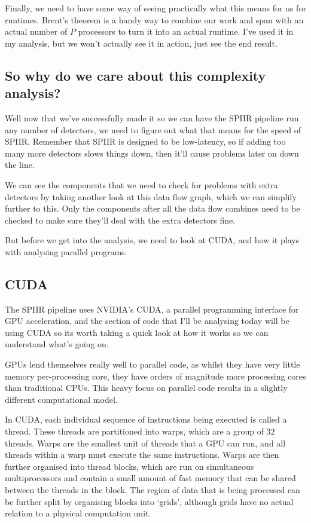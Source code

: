 \documentclass{article}
\begin{document}
Finally, we need to have some way of seeing practically what this means for us for runtimes.
Brent's theorem is a handy way to combine our work and span with an actual number of $P$ processors to turn it into an actual runtime.
I've used it in my analysis, but we won't actually see it in action, just see the end result.

\subsection{So why do we care about this complexity analysis?}

Well now that we've successfully made it so we can have the SPIIR pipeline run any number of detectors, we need to figure out what that means for the speed of SPIIR.
Remember that SPIIR is designed to be low-latency, so if adding too many more detectors slows things down, then it'll cause problems later on down the line.

We can see the components that we need to check for problems with extra detectors by taking another look at this data flow graph, which we can simplify further to this.
Only the components after all the data flow combines need to be checked to make sure they'll deal with the extra detectors fine.

But before we get into the analysis, we need to look at CUDA, and how it plays with analysing parallel programs.

\subsection{CUDA}

The SPIIR pipeline uses NVIDIA's CUDA, a parallel programming interface for GPU acceleration, and the section of code that I'll be analysing today will be using CUDA so its worth taking a quick look at how it works so we can understand what's going on.

GPUs lend themselves really well to parallel code, as whilst they have very little memory per-processing core, they have orders of magnitude more processing cores than traditional CPUs.
This heavy focus on parallel code results in a slightly different computational model.

In CUDA, each individual sequence of instructions being executed is called a thread.
These threads are partitioned into warps, which are a group of 32 threads.
Warps are the smallest unit of threads that a GPU can run, and all threads within a warp must execute the same instructions.
Warps are then further organised into thread blocks, which are run on simultaneous multiprocessors and contain a small amount of fast memory that can be shared between the threads in the block.
The region of data that is being processed can be further split by organising blocks into `grids', although grids have no actual relation to a physical computation unit.
\end{document}

